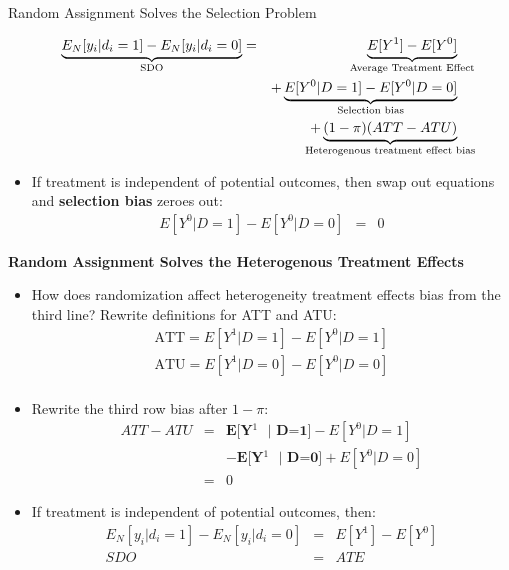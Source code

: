 \documentclass{beamer}
\begin{document}
\begin{frame}{Random Assignment Solves the Selection Problem}

  \begin{eqnarray*}
    \underbrace{E_N[y_i | d_i=1] - E_N[y_i | d_i=0]}_{ \mathclap{\text{SDO}}}&=& \underbrace{E[Y^1] - E[Y^0]}_{ \mathclap{\text{Average Treatment Effect}}} \\
    &&+ \underbrace{E[Y^0|D=1] - E[Y^0 | D=0]}_{ \mathclap{\text{Selection bias}}}  \\
    && + \underbrace{(1-\pi)(ATT - ATU)}_{ \mathclap{\text{Heterogenous treatment effect bias}}}
  \end{eqnarray*}


  \begin{itemize}
    \item If treatment is independent of potential outcomes, then swap out equations and \textbf{selection bias} zeroes out:
          \begin{eqnarray*}
            E[Y^0 | D=1] - E[Y^0 | D=0] &=& 0
          \end{eqnarray*}
  \end{itemize}

\end{frame}

\begin{frame}[shrink=20,plain]
  \begin{center}
    \textbf{Random Assignment Solves the Heterogenous Treatment Effects}
  \end{center}

  \begin{itemize}
    \item How does randomization affect heterogeneity treatment effects bias from the third line?  Rewrite definitions for ATT and ATU:\begin{eqnarray*}
            \text{ATT} = E[Y^1 | D=1] - E[Y^0 | D=1] \\
            \text{ATU} = E[Y^1 | D=0] - E[Y^0 | D=0] \\
          \end{eqnarray*}
    \item Rewrite the third row bias after $1-\pi$:\begin{eqnarray*}
            ATT - ATU &=& \textbf{E[Y$^1$ $|$ D=1]} - E[Y^0 | D=1] \\
            && - \textbf{E[Y$^1$ $|$ D=0]} + E[Y^0 | D=0] \\
            &=& 0
          \end{eqnarray*}
    \item If treatment is independent of potential outcomes, then:\begin{eqnarray*}
            E_N[y_i | d_i=1] - E_N[y_i | d_i=0]  &=& E[Y^1] - E[Y^0] \\
            SDO &=& ATE
          \end{eqnarray*}
  \end{itemize}
\end{frame}
\end{document}
